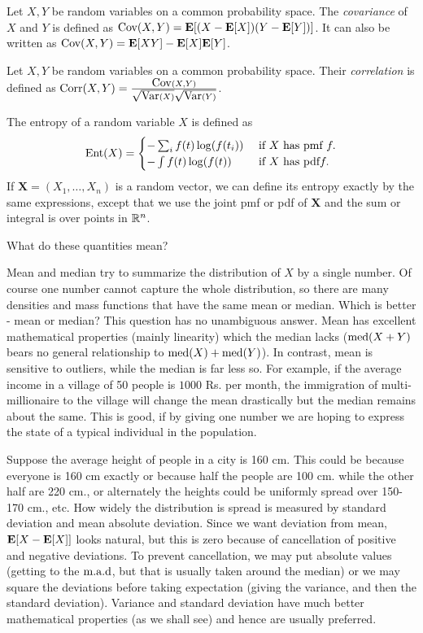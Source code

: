 \documentclass[preprint,  11pt]{amsart}
\def\X{\mathbf{X}}
\begin{document}
 Let $X,Y$ be random variables on a common probability space. The {\em covariance} of $X$ and $Y$ is defined as $\mbox{Cov}(X,Y)=\mathbf{E}[(X-\mathbf{E}[X])(Y-\mathbf{E}[Y])]$. It can also be written as $\mbox{Cov}(X,Y)=\mathbf{E}[XY]-\mathbf{E}[X]\mathbf{E}[Y]$.

 Let $X,Y$ be random variables on a common probability space. Their {\em correlation} is defined as $\mbox{Corr}(X,Y)=\frac{\mbox{Cov}(X,Y)}{\sqrt{\mbox{Var}(X)}\sqrt{\mbox{Var}(Y)}}$.

 The entropy of a random variable $X$ is defined as
$$
\mbox{Ent}(X) = \begin{cases} -\sum_{i} f(t) \log(f(t_{i})) & \mbox{ if }X\mbox{ has pmf }f.\\
-\int\limits f(t) \log(f(t)) & \mbox{ if }X \mbox{ has pdf} f. \end{cases}
$$
If $\X=(X_{1},\ldots ,X_{n})$ is a random vector, we can define its entropy exactly by the same expressions, except that we use the joint pmf or pdf of $\X$ and the sum or integral is over points in $\mathbb{R}^{n}$.




 What do these quantities mean?

 Mean and median  try to summarize the distribution of $X$ by a single number. Of course one number cannot capture the whole distribution, so there are many densities and mass functions that have the same mean or median. Which is better - mean or median? This question has no unambiguous answer. Mean has excellent mathematical properties (mainly linearity) which the median lacks ($\mbox{med}(X+Y)$ bears no general relationship to $\mbox{med}(X)+\mbox{med}(Y)$). In contrast, mean is sensitive to outliers, while the median is far less so. For example, if the average income in a village of 50 people is $1000$ Rs. per month, the immigration of multi-millionaire to the village will change the mean drastically but the median remains about the same. This is good, if by giving one number we are hoping to express the state of a typical individual in the population.

 Suppose the average height of people in a city is 160 cm. This could be because everyone is 160 cm exactly or because half the people are 100 cm. while the other half are 220 cm., or alternately the heights could be uniformly spread over 150-170 cm., etc. How widely the distribution is  spread is measured by standard deviation and mean absolute deviation. Since we want deviation from mean, $\mathbf{E}[X-\mathbf{E}[X]]$ looks natural, but this is zero because of cancellation of positive and negative deviations. To prevent cancellation, we may put absolute values (getting to the $\mbox{m.a.d}$, but that is usually taken around the median) or we may square the deviations before taking expectation (giving the variance, and then the standard deviation). Variance and standard deviation have much better mathematical properties (as we shall see) and hence are usually preferred.
\end{document}
